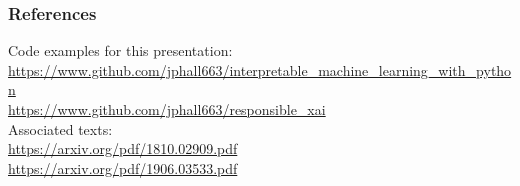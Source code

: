 \documentclass[11pt,aspectratio=169,hyperref={colorlinks}]{beamer}
\begin{document}


	\begin{frame}[t, allowframebreaks]
	
		\frametitle{References}	
		
			\normalsize Code examples for this presentation:\\
			\scriptsize{\url{https://www.github.com/jphall663/interpretable_machine_learning_with_python}}\\
			\noindent\scriptsize{\url{https://www.github.com/jphall663/responsible_xai}}\\
			\vspace{10pt}
			\normalsize Associated texts:\\
			\scriptsize{\url{https://arxiv.org/pdf/1810.02909.pdf}}\\
			\noindent\scriptsize{\url{https://arxiv.org/pdf/1906.03533.pdf}}
								
		\framebreak		
		
		\tiny
		\printbibliography
		
	\end{frame}
\end{document}
